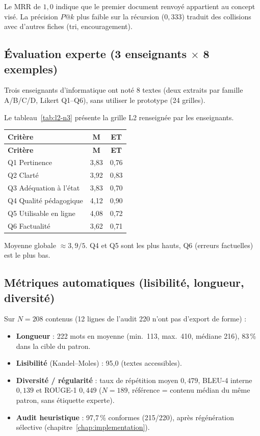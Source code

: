 Le MRR de $1{,}0$ indique que le premier document renvoyé appartient
au concept visé. La précision $P@k$ plus faible sur la récursion
($0{,}333$) traduit des collisions avec d'autres fiches (tri,
encouragement).

\subsection{Évaluation experte (3 enseignants $\times$ 8 exemples)}

Trois enseignants d'informatique ont noté 8 textes
(deux extraits par famille A/B/C/D, Likert Q1--Q6), sans utiliser le
prototype (24 grilles). 

Le tableau~\ref{tab:l2-n3} présente la grille L2 renseignée par les enseignants.

{\small
\renewcommand{\arraystretch}{1.18}
\setlength{\tabcolsep}{4pt}
\begin{xltabular}{\textwidth}{|>{\raggedright\arraybackslash}X|c|c|}
\hline
{}
\textbf{Critère} & $\mathbf{M}$ & \textbf{ET} \\
\hline
\endfirsthead
\hline
{}
\textbf{Critère} & $\mathbf{M}$ & \textbf{ET} \\
\hline
\endhead
\endfoot
\endlastfoot
Q1 Pertinence & 3{,}83 & 0{,}76 \\
\hline
Q2 Clarté & 3{,}92 & 0{,}83 \\
\hline
Q3 Adéquation à l'état & 3{,}83 & 0{,}70 \\
\hline
Q4 Qualité pédagogique & 4{,}12 & 0{,}90 \\
\hline
Q5 Utilisable en ligne & 4{,}08 & 0{,}72 \\
\hline
Q6 Factualité & 3{,}62 & 0{,}71 \\
\hline
\end{xltabular}
\label{tab:l2-n3}
}

Moyenne globale $\approx 3{,}9/5$. Q4 et Q5 sont les plus hauts, Q6
(erreurs factuelles) est le plus bas.
\subsection{Métriques automatiques (lisibilité, longueur, diversité)}

Sur $N=208$ contenus (12 lignes de l'audit 220 n'ont pas d'export de
forme) :

\begin{itemize}[leftmargin=1.4em]
  \item \textbf{Longueur} : 222 mots en moyenne (min.\ 113, max.\ 410,
  médiane 216), 83\,\% dans la cible du patron.
  \item \textbf{Lisibilité} (Kandel--Moles) : 95{,}0 (textes accessibles).
  \item \textbf{Diversité / régularité} : taux de répétition moyen
  $0{,}479$, BLEU-4 interne $0{,}139$ et ROUGE-1 $0{,}449$
  ($N=189$, référence = contenu médian du même patron, sans
  étiquette experte).
  \item \textbf{Audit heuristique} : 97{,}7\,\% conformes (215/220), après
  régénération sélective (chapitre~\ref{chap:implementation}).
\end{itemize}

